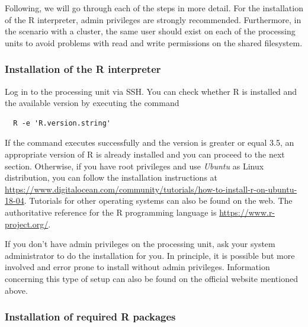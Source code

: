 \documentclass[12pt,a4paper]{scrartcl}
\begin{document}
 Following, we will go through each of the steps in more detail.
 For the installation of the R interpreter, admin privileges are strongly recommended.
 Furthermore, in the scenario with a cluster, the same user should exist on each of the processing units to avoid problems with read and write permissions on the shared filesystem.
 
\subsubsection{Installation of the R interpreter}

Log in to the processing unit via SSH.
You can check whether R is installed and the available version by executing the command
\begin{verbatim}
  R -e 'R.version.string'
\end{verbatim}
If the command executes successfully and the version is greater or equal 3.5, an appropriate version of R is already installed and you can proceed to the next section.
Otherwise, if you have root privileges and use \textit{Ubuntu} as Linux distribution, you can follow the installation instructions at \url{https://www.digitalocean.com/community/tutorials/how-to-install-r-on-ubuntu-18-04}.
Tutorials for other operating systems can also be found on the web.
The authoritative reference for the R programming language is \url{https://www.r-project.org/}.

If you don't have admin privileges on the processing unit, ask your system administrator to do the installation for you.
In principle, it is possible but more involved and error prone to install without admin privileges.
Information concerning this type of setup can also be found on the official website mentioned above.


\subsubsection{Installation of required R packages}
\end{document}

